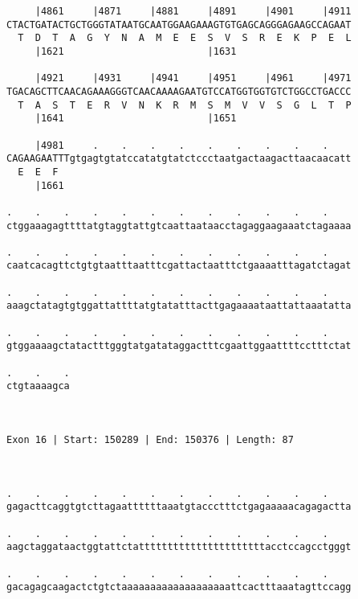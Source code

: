 \documentclass{article}
\begin{document}
\begin{Verbatim}
     |4861     |4871     |4881     |4891     |4901     |4911
CTACTGATACTGCTGGGTATAATGCAATGGAAGAAAGTGTGAGCAGGGAGAAGCCAGAAT
  T  D  T  A  G  Y  N  A  M  E  E  S  V  S  R  E  K  P  E  L
     |1621                         |1631                    
  
     |4921     |4931     |4941     |4951     |4961     |4971
TGACAGCTTCAACAGAAAGGGTCAACAAAAGAATGTCCATGGTGGTGTCTGGCCTGACCC
  T  A  S  T  E  R  V  N  K  R  M  S  M  V  V  S  G  L  T  P
     |1641                         |1651                    
  
     |4981     .    .    .    .    .    .    .    .    .    
CAGAAGAATTTgtgagtgtatccatatgtatctccctaatgactaagacttaacaacatt
  E  E  F                                                   
     |1661                                                  
  
.    .    .    .    .    .    .    .    .    .    .    .    
ctggaaagagttttatgtaggtattgtcaattaataacctagaggaagaaatctagaaaa
                                                            
.    .    .    .    .    .    .    .    .    .    .    .    
caatcacagttctgtgtaatttaatttcgattactaatttctgaaaatttagatctagat
                                                            
.    .    .    .    .    .    .    .    .    .    .    .    
aaagctatagtgtggattattttatgtatatttacttgagaaaataattattaaatatta
                                                            
.    .    .    .    .    .    .    .    .    .    .    .    
gtggaaaagctatactttgggtatgatataggactttcgaattggaattttcctttctat
                                                            
.    .    .
ctgtaaaagca
           
           
 
Exon 16 | Start: 150289 | End: 150376 | Length: 87



.    .    .    .    .    .    .    .    .    .    .    .    
gagacttcaggtgtcttagaattttttaaatgtaccctttctgagaaaaacagagactta
                                                            
.    .    .    .    .    .    .    .    .    .    .    .    
aagctaggataactggtattctattttttttttttttttttttttacctccagcctgggt
                                                            
.    .    .    .    .    .    .    .    .    .    .    .    
gacagagcaagactctgtctaaaaaaaaaaaaaaaaaaattcactttaaatagttccagg
                                                            

\end{Verbatim}
\end{document}
